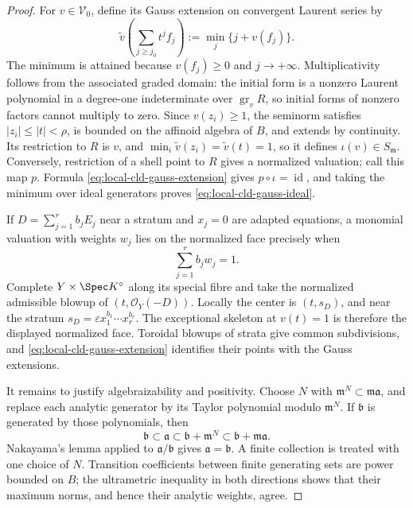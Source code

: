 \begin{proof}
For \(v\in\mathcal V_0\), define its Gauss extension on convergent Laurent
series by
\[
 \widetilde v\!\left(\sum_{j\geq j_0}t^jf_j\right)
       :=\min_j\{j+v(f_j)\}.
\tag{70.40}\label{eq:local-cld-gauss-extension}
\]
The minimum is attained because \(v(f_j)\geq0\) and \(j\to+\infty\).
Multiplicativity follows from the associated graded domain: the initial
form is a nonzero Laurent polynomial in a degree-one indeterminate over
\(\operatorname{gr}_vR\), so initial forms of nonzero factors cannot
multiply to zero. Since \(v(z_i)\geq1\), the seminorm satisfies
\(|z_i|\leq|t|<\rho\), is bounded on the affinoid algebra of \(B\), and
extends by continuity. Its restriction to \(R\) is \(v\), and
\(\min_i\widetilde v(z_i)=\widetilde v(t)=1\), so it defines
\(\iota(v)\in S_{\mathfrak m}\). Conversely, restriction of a shell point
to \(R\) gives a normalized valuation; call this map \(p\). Formula
\eqref{eq:local-cld-gauss-extension} gives \(p\circ\iota=\operatorname{id}\),
and taking the minimum over ideal generators proves
\eqref{eq:local-cld-gauss-ideal}.

If \(D=\sum_{j=1}^rb_jE_j\) near a stratum and \(x_j=0\) are adapted
equations, a monomial valuation with weights \(w_j\) lies on the normalized
face precisely when
\[
                         \sum_{j=1}^rb_jw_j=1.
\]
Complete \(Y\times\Spec K^\circ\) along its special fibre and take the
normalized admissible blowup of
\((t,\mathcal O_Y(-D))\). Locally the center is \((t,s_D)\), and near the
stratum
\(s_D=\varepsilon x_1^{b_1}\cdots x_r^{b_r}\). The exceptional skeleton at
\(v(t)=1\) is therefore the displayed normalized face. Toroidal blowups of
strata give common subdivisions, and
\eqref{eq:local-cld-gauss-extension} identifies their points with the Gauss
extensions.

It remains to justify algebraizability and positivity. Choose \(N\) with
\(\mathfrak m^N\subset\mathfrak m\mathfrak a\), and replace each analytic
generator by its Taylor polynomial modulo \(\mathfrak m^N\). If
\(\mathfrak b\) is generated by those polynomials, then
\[
 \mathfrak b\subset\mathfrak a
 \subset\mathfrak b+\mathfrak m^N
 \subset\mathfrak b+\mathfrak m\mathfrak a.
\]
Nakayama's lemma applied to \(\mathfrak a/\mathfrak b\) gives
\(\mathfrak a=\mathfrak b\). A finite collection is treated with one
choice of \(N\). Transition coefficients between finite generating sets
are power bounded on \(B\); the ultrametric inequality in both directions
shows that their maximum norms, and hence their analytic weights, agree.


\end{proof}
